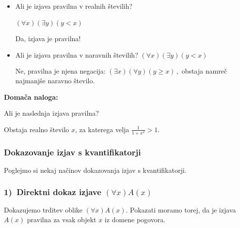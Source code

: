 \documentclass[11pt,paper=b5,DIV=13,headinclude,footinclude]{scrbook}
\newcounter{example}
\def\cee {{~\Leftrightarrow~}}
\begin{document}
\begin{itemize}
  \item Ali je izjava pravilna v realnih številih?

  $(\forall x)(\exists y)(y<x)$

  Da, izjava je pravilna!

  \item Ali je izjava pravilna v naravnih številih?
  $(\forall x)(\exists y)(y<x)$

Ne, pravilna je njena negacija:
$(\exists x)(\forall y)(y\ge x)\,,$
obstaja namreč najmanjše naravno število.
\end{itemize}

\textbf{ Domača naloga:}

Ali je naslednja izjava pravilna?

Obstaja realno število $x$, za katerega velja $\frac{1}{1+x^2}>1$.

%
%
%
%
%
%
%


\subsubsection{Dokazovanje izjav s kvantifikatorji}

Poglejmo si nekaj načinov dokazovanja izjav s kvantifikatorji.

\subsubsection*{1)~Direktni dokaz izjave $(\forall x)A(x)$}

Dokazujemo trditev oblike $(\forall x)A(x)$.  Pokazati moramo torej, da je izjava $A(x)$
pravilna za vsak objekt $x$ iz domene pogovora.
\end{document}
